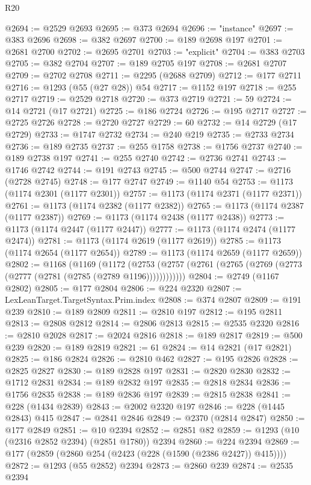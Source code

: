 \begin{lexlean}{R20}
\begin{coremodule}
@2694 := @2529 @2693
@2695 := @373 @2694
@2696 := "instance"
@2697 := @383 @2696
@2698 := @382 @2697
@2700 := @189 @2698 @197
@2701 := @2681 @2700
@2702 := @2695 @2701
@2703 := "explicit"
@2704 := @383 @2703
@2705 := @382 @2704
@2707 := @189 @2705 @197
@2708 := @2681 @2707
@2709 := @2702 @2708
@2711 := @2295 (@2688 @2709)
@2712 := @177 @2711
@2716 := @1293 (@55 (@27 @28)) @54
@2717 := @1152 @197
@2718 := @255 @2717
@2719 := @2529 @2718
@2720 := @373 @2719
@2721 := 59
@2724 := @14 @2721 (@17 @2721)
@2725 := @186 @2724
@2726 := @195 @2717
@2727 := @2725 @2726
@2728 := @2720 @2727
@2729 := 60
@2732 := @14 @2729 (@17 @2729)
@2733 := @1747 @2732
@2734 := @240 @219
@2735 := @2733 @2734
@2736 := @189 @2735
@2737 := @255 @1758
@2738 := @1756 @2737
@2740 := @189 @2738 @197
@2741 := @255 @2740
@2742 := @2736 @2741
@2743 := @1746 @2742
@2744 := @191 @2743
@2745 := @500 @2744
@2747 := @2716 (@2728 @2745)
@2748 := @177 @2747
@2749 := @1140 @54
@2753 := @1173 (@1174 @2301 (@1177 @2301))
@2757 := @1173 (@1174 @2371 (@1177 @2371))
@2761 := @1173 (@1174 @2382 (@1177 @2382))
@2765 := @1173 (@1174 @2387 (@1177 @2387))
@2769 := @1173 (@1174 @2438 (@1177 @2438))
@2773 := @1173 (@1174 @2447 (@1177 @2447))
@2777 := @1173 (@1174 @2474 (@1177 @2474))
@2781 := @1173 (@1174 @2619 (@1177 @2619))
@2785 := @1173 (@1174 @2654 (@1177 @2654))
@2789 := @1173 (@1174 @2659 (@1177 @2659))
@2802 := @1168
    (@1169
      (@1172 (@2753 (@2757 (@2761 (@2765 (@2769 (@2773 (@2777 (@2781 (@2785 (@2789 @1196))))))))))))
@2804 := @2749 (@1167 @2802)
@2805 := @177 @2804
@2806 := @224 @2320
@2807 := LexLeanTarget.TargetSyntax.Prim.index
@2808 := @374 @2807
@2809 := @191 @239
@2810 := @189 @2809
@2811 := @2810 @197
@2812 := @195 @2811
@2813 := @2808 @2812
@2814 := @2806 @2813
@2815 := @2535 @2320
@2816 := @2810 @2028
@2817 := @2024 @2816
@2818 := @189 @2817
@2819 := @500 @239
@2820 := @189 @2819
@2821 := 61
@2824 := @14 @2821 (@17 @2821)
@2825 := @186 @2824
@2826 := @2810 @462
@2827 := @195 @2826
@2828 := @2825 @2827
@2830 := @189 @2828 @197
@2831 := @2820 @2830
@2832 := @1712 @2831
@2834 := @189 @2832 @197
@2835 := @2818 @2834
@2836 := @1756 @2835
@2838 := @189 @2836 @197
@2839 := @2815 @2838
@2841 := @228 (@1434 @2839)
@2843 := @2002 @2320 @197
@2846 := @228 (@1445 @2843) @415
@2847 := @2841 @2846
@2849 := @2370 (@2814 @2847)
@2850 := @177 @2849
@2851 := @10 @2394
@2852 := @2851 @82
@2859 := @1293 (@10 (@2316 @2852 @2394) (@2851 @1780)) @2394
@2860 := @224 @2394
@2869 := @177 (@2859 (@2860 @254 (@2423 (@228 (@1590 (@2386 @2427)) @415))))
@2872 := @1293 (@55 @2852) @2394
@2873 := @2860 @239
@2874 := @2535 @2394

\end{coremodule}
\end{lexlean}
